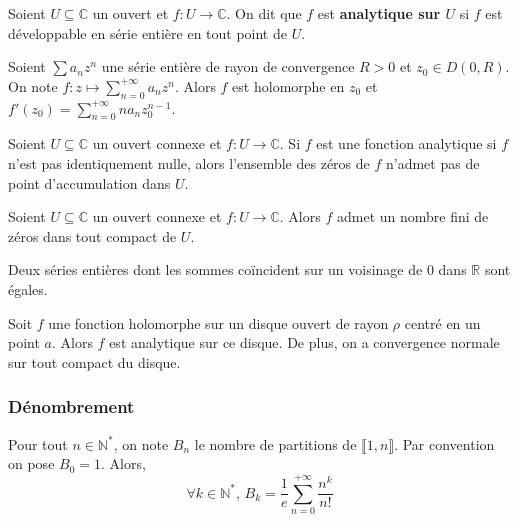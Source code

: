 
	\begin{definition}
		Soient $U \subseteq \mathbb{C}$ un ouvert et $f : U \rightarrow \mathbb{C}$. On dit que $f$ est \textbf{analytique sur $U$} si $f$ est développable en série entière en tout point de $U$.
	\end{definition}

	\begin{theorem}
		Soient $\sum a_n z^n$ une série entière de rayon de convergence $R > 0$ et $z_0 \in D(0,R)$. On note $f : z \mapsto \sum_{n=0}^{+\infty} a_n z^n$.
		Alors $f$ est holomorphe en $z_0$ et $f'(z_0) = \sum_{n=0}^{+\infty} n a_n z_0^{n-1}$.
	\end{theorem}

	\begin{theorem}
		Soient $U \subseteq \mathbb{C}$ un ouvert connexe et $f : U \rightarrow \mathbb{C}$. Si $f$ est une fonction analytique si $f$ n'est pas identiquement nulle, alors l'ensemble des zéros de $f$ n'admet pas de point d'accumulation dans $U$.
	\end{theorem}

	\begin{corollary}
		Soient $U \subseteq \mathbb{C}$ un ouvert connexe et $f : U \rightarrow \mathbb{C}$. Alors $f$ admet un nombre fini de zéros dans tout compact de $U$.
	\end{corollary}


	\begin{corollary}
		Deux séries entières dont les sommes coïncident sur un voisinage de $0$ dans $\mathbb{R}$ sont égales.
	\end{corollary}


	\begin{theorem}
		Soit $f$ une fonction holomorphe sur un disque ouvert de rayon $\rho$ centré en un point $a$. Alors $f$ est analytique sur ce disque.
		De plus, on a convergence normale sur tout compact du disque.
	\end{theorem}

	\subsubsection{Dénombrement}


	\begin{application}
		Pour tout $n \in \mathbb{N}^*$, on note $B_n$ le nombre de partitions de $\llbracket 1, n \rrbracket$. Par convention on pose $B_0 = 1$. Alors,
		\[ \forall k \in \mathbb{N}^*, \, B_k = \frac{1}{e} \sum_{n=0}^{+\infty} \frac{n^k}{n!} \]
	\end{application}

